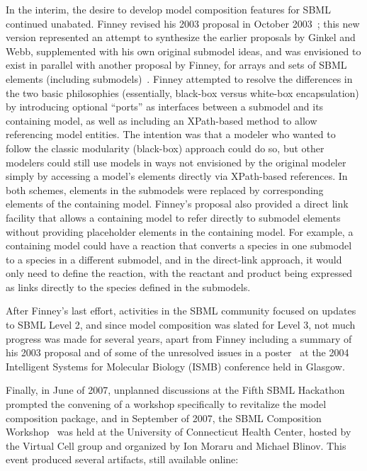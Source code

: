 In the interim, the desire to develop model composition features for
SBML continued unabated.  Finney revised his 2003 proposal in October
2003~\cite{}; this new version represented an attempt to synthesize the
earlier proposals by Ginkel and Webb, supplemented with his own original
submodel ideas, and was envisioned to exist in parallel with another
proposal by Finney, for arrays and sets of SBML elements (including
submodels)~\cite{}.  Finney attempted to resolve the differences in the
two basic philosophies (essentially, black-box versus white-box
encapsulation) by introducing optional ``ports'' as interfaces between a
submodel and its containing model, as well as including an XPath-based
method to allow referencing model entities.  The intention was that a
modeler who wanted to follow the classic modularity (black-box) approach
could do so, but other modelers could still use models in ways not
envisioned by the original modeler simply by accessing a model's
elements directly via XPath-based references.  In both schemes, elements
in the submodels were replaced by corresponding elements of the
containing model.  Finney's proposal also provided a direct link
facility that allows a containing model to refer directly to submodel
elements without providing placeholder elements in the containing
model.  For example, a containing model could have a reaction that
converts a species in one submodel to a species in a different submodel,
and in the direct-link approach, it would only need to define the
reaction, with the reactant and product being expressed as links
directly to the species defined in the submodels.

After Finney's last effort, activities in the SBML community focused on
updates to SBML Level 2, and since model composition was slated for
Level 3, not much progress was made for several years, apart from Finney
including a summary of his 2003 proposal and of some of the unresolved
issues in a poster~\cite{} at the 2004 Intelligent Systems for Molecular
Biology (ISMB) conference held in Glasgow.

Finally, in June of 2007, unplanned discussions at the Fifth SBML
Hackathon~\cite{} prompted the convening of a workshop specifically to
revitalize the model composition package, and in September of 2007, the
SBML Composition Workshop~\cite{} was held at the University of
Connecticut Health Center, hosted by the Virtual Cell group and
organized by Ion Moraru and Michael Blinov.  This event produced several
artifacts, still available online:

